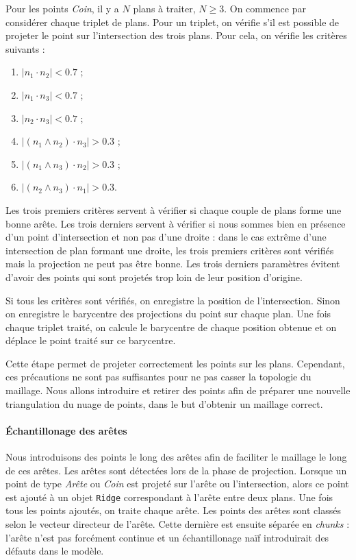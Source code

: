\documentclass[12pt, twoside]{article}
\begin{document}
Pour les points \textit{Coin}, il y a $N$ plans à traiter, $N \geq 3$. On commence par considérer chaque triplet de plans. Pour un triplet, on vérifie s'il est possible de projeter le point sur l'intersection des trois plans. Pour cela, on vérifie les critères suivants :
\begin{enumerate}
  \item $\vert n_1 \cdot n_2 \vert < 0.7$ ;
  \item $\vert n_1 \cdot n_3 \vert < 0.7$ ;
  \item $\vert n_2 \cdot n_3 \vert < 0.7$ ;
  \item $\vert (n_1 \wedge n_2) \cdot n_3 \vert > 0.3$ ;
  \item $\vert (n_1 \wedge n_3) \cdot n_2 \vert > 0.3$ ;
  \item $\vert (n_2 \wedge n_3) \cdot n_1 \vert > 0.3$.
\end{enumerate}
Les trois premiers critères servent à vérifier si chaque couple de plans forme une bonne arête. Les trois derniers servent à vérifier si nous sommes bien en présence d'un point d'intersection et non pas d'une droite : dans le cas extrême d'une intersection de plan formant une droite, les trois premiers critères sont vérifiés mais la projection ne peut pas être bonne. Les trois derniers paramètres évitent d'avoir des points qui sont projetés trop loin de leur position d'origine.

Si tous les critères sont vérifiés, on enregistre la position de l'intersection. Sinon on enregistre le barycentre des projections du point sur chaque plan. Une fois chaque triplet traité, on calcule le barycentre de chaque position obtenue et on déplace le point traité sur ce barycentre.

Cette étape permet de projeter correctement les points sur les plans. Cependant, ces précautions ne sont pas suffisantes pour ne pas casser la topologie du maillage. Nous allons introduire et retirer des points afin de préparer une nouvelle triangulation du nuage de points, dans le but d'obtenir un maillage correct.

\paragraph{Échantillonage des arêtes} Nous introduisons des points le long des arêtes afin de faciliter le maillage le long de ces arêtes. Les arêtes sont détectées lors de la phase de projection. Lorsque un point de type \textit{Arête} ou \textit{Coin} est projeté sur l'arête ou l'intersection, alors ce point est ajouté à un objet \texttt{Ridge} correspondant à l'arête entre deux plans. Une fois tous les points ajoutés, on traite chaque arête. Les points des arêtes sont classés selon le vecteur directeur de l'arête. Cette dernière est ensuite séparée en \textit{chunks} : l'arête n'est pas forcément continue et un échantillonage naïf introduirait des défauts dans le modèle.
\end{document}
